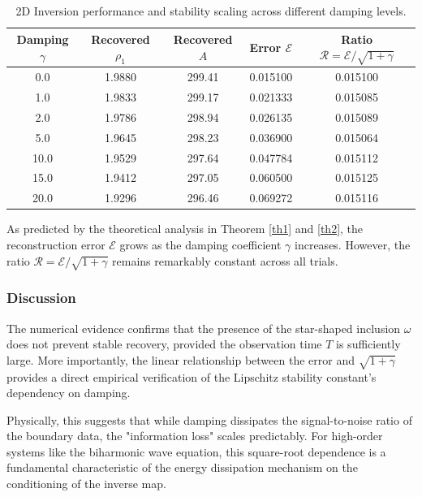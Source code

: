 \documentclass[12pt,reqno]{amsart}
\numberwithin{equation}{section}
\begin{document}
	\begin{table}[h]
		\centering
		\caption{2D Inversion performance and stability scaling across different damping levels.}
		\label{tab:2d_results}
		\vspace{2mm}
		\begin{tabular}{ccccc}
			\hline
			Damping $\gamma$ & Recovered $\rho_1$ & Recovered $A$ & Error $\mathcal{E}$ & Ratio $\mathcal{R} = \mathcal{E}/\sqrt{1+\gamma}$ \\ \hline
			0.0  & 1.9880 & 299.41 & 0.015100 & 0.015100 \\
			1.0  & 1.9833 & 299.17 & 0.021333 & 0.015085 \\
			2.0  & 1.9786 & 298.94 & 0.026135 & 0.015089 \\
			5.0  & 1.9645 & 298.23 & 0.036900 & 0.015064 \\
			10.0 & 1.9529 & 297.64 & 0.047784 & 0.015112 \\
			15.0 & 1.9412 & 297.05 & 0.060500 & 0.015125 \\
			20.0 & 1.9296 & 296.46 & 0.069272 & 0.015116 \\ \hline
		\end{tabular}
	\end{table}
	
	As predicted by the theoretical analysis in Theorem \ref{th1} and \ref{th2}, the reconstruction error $\mathcal{E}$ grows as the damping coefficient $\gamma$ increases. However, the ratio $\mathcal{R} = \mathcal{E}/\sqrt{1+\gamma}$ remains remarkably constant across all trials. 
	
	\subsubsection{Discussion}
	The numerical evidence confirms that the presence of the star-shaped inclusion $\omega$ does not prevent stable recovery, provided the observation time $T$ is sufficiently large. More importantly, the linear relationship between the error and $\sqrt{1+\gamma}$ provides a direct empirical verification of the Lipschitz stability constant's dependency on damping. 
	
	Physically, this suggests that while damping dissipates the signal-to-noise ratio of the boundary data, the "information loss" scales predictably. For high-order systems like the biharmonic wave equation, this square-root dependence is a fundamental characteristic of the energy dissipation mechanism on the conditioning of the inverse map.
	
	
\end{document}
